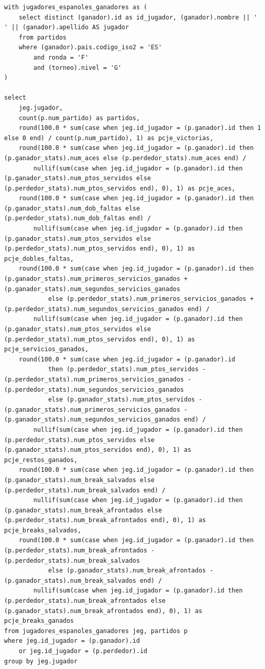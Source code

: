 \documentclass[11pt]{opticajnl}
\begin{document}
\begin{verbatim}
with jugadores_espanoles_ganadores as (
    select distinct (ganador).id as id_jugador, (ganador).nombre || ' ' || (ganador).apellido AS jugador
    from partidos
    where (ganador).pais.codigo_iso2 = 'ES'
        and ronda = 'F'
        and (torneo).nivel = 'G'
)

select
    jeg.jugador,
    count(p.num_partido) as partidos,
    round(100.0 * sum(case when jeg.id_jugador = (p.ganador).id then 1 else 0 end) / count(p.num_partido), 1) as pcje_victorias,
    round(100.0 * sum(case when jeg.id_jugador = (p.ganador).id then (p.ganador_stats).num_aces else (p.perdedor_stats).num_aces end) /
        nullif(sum(case when jeg.id_jugador = (p.ganador).id then (p.ganador_stats).num_ptos_servidos else (p.perdedor_stats).num_ptos_servidos end), 0), 1) as pcje_aces,
    round(100.0 * sum(case when jeg.id_jugador = (p.ganador).id then (p.ganador_stats).num_dob_faltas else (p.perdedor_stats).num_dob_faltas end) /
        nullif(sum(case when jeg.id_jugador = (p.ganador).id then (p.ganador_stats).num_ptos_servidos else (p.perdedor_stats).num_ptos_servidos end), 0), 1) as pcje_dobles_faltas,
    round(100.0 * sum(case when jeg.id_jugador = (p.ganador).id then (p.ganador_stats).num_primeros_servicios_ganados + (p.ganador_stats).num_segundos_servicios_ganados
            else (p.perdedor_stats).num_primeros_servicios_ganados + (p.perdedor_stats).num_segundos_servicios_ganados end) /
        nullif(sum(case when jeg.id_jugador = (p.ganador).id then (p.ganador_stats).num_ptos_servidos else (p.perdedor_stats).num_ptos_servidos end), 0), 1) as pcje_servicios_ganados,
    round(100.0 * sum(case when jeg.id_jugador = (p.ganador).id
            then (p.perdedor_stats).num_ptos_servidos - (p.perdedor_stats).num_primeros_servicios_ganados - (p.perdedor_stats).num_segundos_servicios_ganados
            else (p.ganador_stats).num_ptos_servidos - (p.ganador_stats).num_primeros_servicios_ganados - (p.ganador_stats).num_segundos_servicios_ganados end) /
        nullif(sum(case when jeg.id_jugador = (p.ganador).id then (p.perdedor_stats).num_ptos_servidos else (p.ganador_stats).num_ptos_servidos end), 0), 1) as pcje_restos_ganados,
    round(100.0 * sum(case when jeg.id_jugador = (p.ganador).id then (p.ganador_stats).num_break_salvados else (p.perdedor_stats).num_break_salvados end) /
        nullif(sum(case when jeg.id_jugador = (p.ganador).id then (p.ganador_stats).num_break_afrontados else (p.perdedor_stats).num_break_afrontados end), 0), 1) as pcje_breaks_salvados,
    round(100.0 * sum(case when jeg.id_jugador = (p.ganador).id then (p.perdedor_stats).num_break_afrontados - (p.perdedor_stats).num_break_salvados
            else (p.ganador_stats).num_break_afrontados - (p.ganador_stats).num_break_salvados end) /
        nullif(sum(case when jeg.id_jugador = (p.ganador).id then (p.perdedor_stats).num_break_afrontados else (p.ganador_stats).num_break_afrontados end), 0), 1) as pcje_breaks_ganados
from jugadores_espanoles_ganadores jeg, partidos p
where jeg.id_jugador = (p.ganador).id
    or jeg.id_jugador = (p.perdedor).id
group by jeg.jugador
\end{verbatim}
\end{document}
